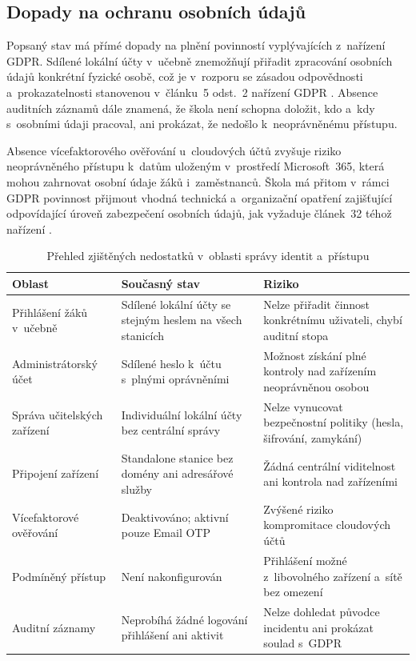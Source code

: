 \documentclass[male,czech,api_bc]{kitheses}
\begin{document}
\subsection{Dopady na ochranu osobních údajů}

Popsaný stav má přímé dopady na plnění povinností vyplývajících z~nařízení 
GDPR. Sdílené lokální účty v~učebně znemožňují přiřadit zpracování osobních 
údajů konkrétní fyzické osobě, což je v~rozporu se zásadou odpovědnosti 
a~prokazatelnosti stanovenou v~článku~5 odst.~2 nařízení GDPR \cite{GDPR2016}. 
Absence auditních záznamů dále znamená, že škola není schopna doložit, kdo 
a~kdy s~osobními údaji pracoval, ani prokázat, že nedošlo k~neoprávněnému 
přístupu.

Absence vícefaktorového ověřování u~cloudových účtů zvyšuje riziko 
neoprávněného přístupu k~datům uloženým v~prostředí Microsoft~365, 
která mohou zahrnovat osobní údaje žáků i~zaměstnanců. Škola má přitom 
v~rámci GDPR povinnost přijmout vhodná technická a~organizační opatření 
zajišťující odpovídající úroveň zabezpečení osobních údajů, jak vyžaduje 
článek~32 téhož nařízení \cite{GDPR2016}.

\begin{table}[h]
\centering
\caption{Přehled zjištěných nedostatků v~oblasti správy identit a~přístupu}
\label{tab:nedostatky}
\begin{tabular}{|p{3.5cm}|p{5cm}|p{5cm}|}
\hline
\textbf{Oblast} & \textbf{Současný stav} & \textbf{Riziko} \\
\hline
Přihlášení žáků v~učebně & 
Sdílené lokální účty se stejným heslem na všech stanicích & 
Nelze přiřadit činnost konkrétnímu uživateli, chybí auditní stopa \\
\hline
Administrátorský účet & 
Sdílené heslo k~účtu s~plnými oprávněními & 
Možnost získání plné kontroly nad zařízením neoprávněnou osobou \\
\hline
Správa učitelských zařízení & 
Individuální lokální účty bez centrální správy & 
Nelze vynucovat bezpečnostní politiky (hesla, šifrování, zamykání) \\
\hline
Připojení zařízení & 
Standalone stanice bez domény ani adresářové služby & 
Žádná centrální viditelnost ani kontrola nad zařízeními \\
\hline
Vícefaktorové ověřování & 
Deaktivováno; aktivní pouze Email OTP & 
Zvýšené riziko kompromitace cloudových účtů \\
\hline
Podmíněný přístup & 
Není nakonfigurován & 
Přihlášení možné z~libovolného zařízení a~sítě bez omezení \\
\hline
Auditní záznamy & 
Neprobíhá žádné logování přihlášení ani aktivit & 
Nelze dohledat původce incidentu ani prokázat soulad s~GDPR \\
\hline
\end{tabular}
\end{table}
\end{document}
